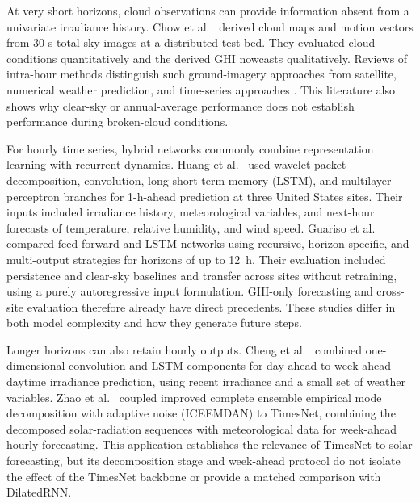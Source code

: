 At very short horizons, cloud observations can provide information absent
from a univariate irradiance history. Chow et al.\ \cite{chow2011} derived
cloud maps and motion vectors from 30-s total-sky images at a distributed
test bed. They evaluated cloud conditions quantitatively and the derived GHI
nowcasts qualitatively. Reviews of intra-hour methods distinguish such
ground-imagery approaches from satellite, numerical weather prediction, and
time-series approaches \cite{chu2021,lin2023}. This literature also shows
why clear-sky or annual-average performance does not establish performance
during broken-cloud conditions.

For hourly time series, hybrid networks commonly combine representation
learning with recurrent dynamics. Huang et al.\ \cite{huang2021} used wavelet
packet decomposition, convolution, long short-term memory (LSTM), and
multilayer perceptron branches for 1-h-ahead prediction at three United
States sites. Their inputs included irradiance history, meteorological
variables, and next-hour forecasts of temperature, relative humidity, and
wind speed. Guariso et al.\ \cite{guariso2020} compared feed-forward and LSTM
networks using recursive, horizon-specific, and multi-output strategies for
horizons of up to 12~h. Their evaluation included persistence and clear-sky
baselines and transfer across sites without retraining, using a purely
autoregressive input formulation. GHI-only forecasting and cross-site
evaluation therefore already have direct precedents. These studies differ in
both model complexity and how they generate future steps.

Longer horizons can also retain hourly outputs. Cheng et al.\
\cite{cheng2021} combined one-dimensional convolution and LSTM components
for day-ahead to week-ahead daytime irradiance prediction, using recent
irradiance and a small set of weather variables. Zhao et al.\
\cite{zhao2024timesnet} coupled improved complete ensemble empirical mode
decomposition with adaptive noise (ICEEMDAN) to TimesNet, combining the
decomposed solar-radiation sequences with meteorological data for
week-ahead hourly forecasting. This application establishes the relevance
of TimesNet to solar forecasting, but its decomposition stage and
week-ahead protocol do not isolate the effect of the TimesNet backbone or
provide a matched comparison with DilatedRNN.

